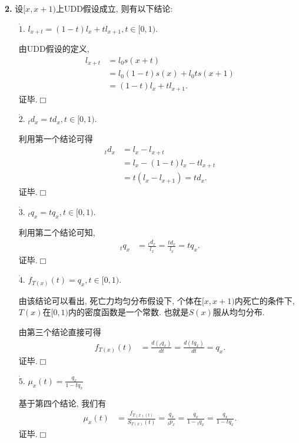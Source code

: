 \documentclass[a4paper,openany, 10pt]{ctexbook}
\def\qed{\hfill$\Box$\medskip}
\begin{document}
{\rm\bf2.} 设$[x,x+1)$上UDD假设成立, 则有以下结论:
\begin{enumerate}
    \item[$\mathring 1.$] $l_{x+t}=(1-t)l_{x}+tl_{x+1},t\in [0,1).$

        \proof 由UDD假设的定义, \begin{align*}
            l_{x+t} & =l_{0}s(x+t)                 \\
                    & =l_{0}(1-t)s(x)+l_{0}ts(x+1) \\
                    & =(1-t)l_{x}+tl_{x+1}.
        \end{align*}
        证毕.\qed
    \item[$\mathring 2.$] $_{t}d_{x}=td_{x},t\in [0,1).$

 \proof
利用第一个结论可得
       \begin{align*}
            _{t}d_{x} & =l_{x}-l_{x+t}             \\
                      & =l_x-(1-t)l_{x}-tl_{x+t}   \\
                      & =t(l_{x}-l_{x+1}) =td_{x}.
        \end{align*}
        证毕.\qed
    \item[$\mathring 3.$] $_{t}q_{x}=tq_{x},t\in [0,1).$

        \proof 利用第二个结论可知, \begin{align*}
            _{t}q_{x} & =\frac{_{t}d_{x}}{l_{x}} =\frac{td_{x}}{l_{x}}  = tq_{x}.
        \end{align*}
        证毕.\qed
    \item[$\mathring 4.$] $f_{T(x)}(t)=q_{x},t\in [0,1).$

        由该结论可以看出, 死亡力均匀分布假设下, 个体在$[x,x+1)$内死亡的条件下, $T(x)$在$[0,1)$内的密度函数是一个常数. 也就是$S(x)$服从均匀分布.

        \proof 由第三个结论直接可得\begin{align*}
            f_{T(x)}(t) & =\frac{d(_{t}q_{x})}{dt} =\frac{d(tq_{x})}{dt} =q_x.
        \end{align*}
        证毕.\qed
    \item [$\mathring 5.$] $\mu_{x}(t)=\frac{q_{x}}{1-tq_x}$

          \proof 基于第四个结论, 我们有\begin{align*}
              \mu_{x}(t) & =\frac{f_{T(x)(t)}}{S_{T(x)}(t)} =\frac{q_{x}}{_{t}p_{x}} =\frac{q_{x}}{1-{}_{t}q_{x}} =\frac{q_{x}}{1-tq_{x}}.
          \end{align*}
          证毕.\qed
\end{enumerate}
\end{document}
